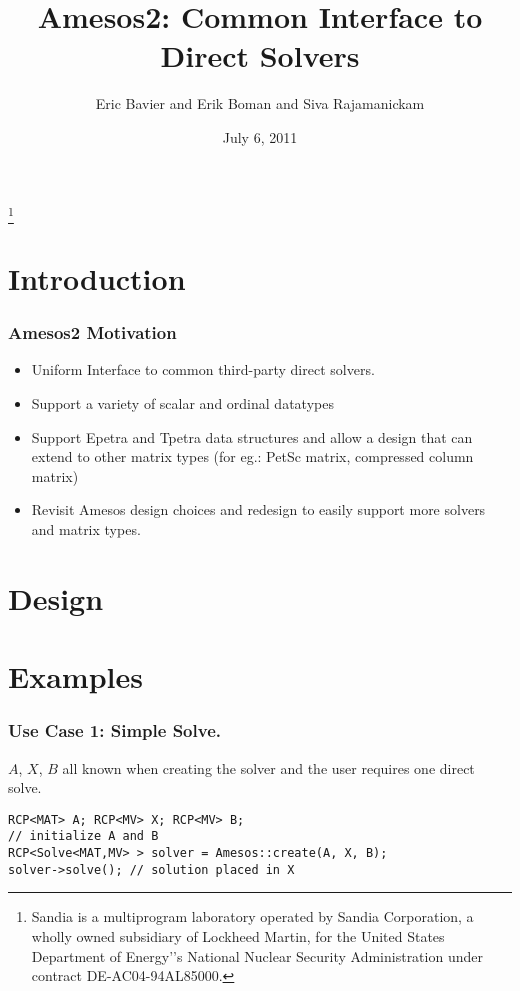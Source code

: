 \documentclass[xcolor=dvipsnames]{beamer}
\title[Amesos2]{Amesos2: Common Interface to Direct Solvers}
\author[Bavier,Boman,Rajamanickam]{Eric Bavier and Erik Boman and Siva Rajamanickam}
\institute[SNL]{
Sandia National Laboratories
}
\date[]{July 6, 2011}
\begin{document}
\begin{frame}[plain]
  \titlepage
  \footnote{\tiny{Sandia is a multiprogram laboratory operated by Sandia Corporation, a wholly owned subsidiary of Lockheed Martin, for the United States Department of Energy'’s National Nuclear Security Administration under contract DE-AC04-94AL85000.}}
\end{frame}

\section{Introduction}

\begin{frame}
  \frametitle{Amesos2 Motivation}

  \begin{itemize}
  \item Uniform Interface to common third-party direct solvers.
    \medskip
  \item Support a variety of scalar and ordinal datatypes
    \medskip
  \item Support Epetra and Tpetra data structures and allow a design that can
    extend to other matrix types (for eg.: PetSc matrix, compressed column
    matrix)
    \medskip
  \item Revisit Amesos design choices and redesign to easily support more
    solvers and matrix types.
  \end{itemize}
\end{frame}

\section{Design}

\section{Examples}

\begin{frame}[fragile]          %
  \frametitle{Use Case 1: Simple Solve.}

  $A$, $X$, $B$ all known when creating the solver and the user
  requires one direct solve.

  \begin{lstlisting}
RCP<MAT> A; RCP<MV> X; RCP<MV> B;
// initialize A and B
RCP<Solve<MAT,MV> > solver = Amesos::create(A, X, B);
solver->solve(); // solution placed in X
  \end{lstlisting}
\end{frame}
\end{document}

